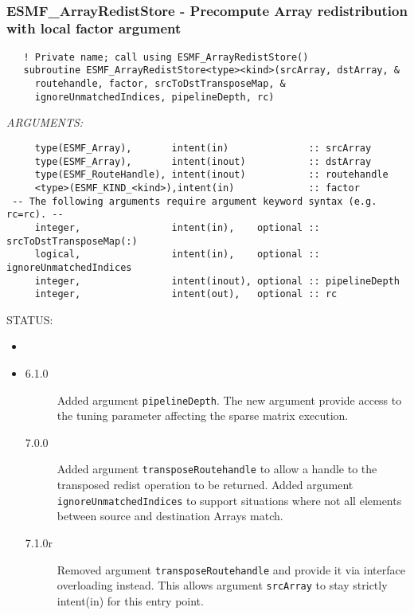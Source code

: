  
\mbox{}\hrulefill\ 
 
\subsubsection [ESMF\_ArrayRedistStore] {ESMF\_ArrayRedistStore - Precompute Array redistribution with local factor argument}


  
\begin{verbatim}   ! Private name; call using ESMF_ArrayRedistStore()
   subroutine ESMF_ArrayRedistStore<type><kind>(srcArray, dstArray, &
     routehandle, factor, srcToDstTransposeMap, &
     ignoreUnmatchedIndices, pipelineDepth, rc)\end{verbatim}{\em ARGUMENTS:}
\begin{verbatim}     type(ESMF_Array),       intent(in)              :: srcArray
     type(ESMF_Array),       intent(inout)           :: dstArray
     type(ESMF_RouteHandle), intent(inout)           :: routehandle
     <type>(ESMF_KIND_<kind>),intent(in)             :: factor
 -- The following arguments require argument keyword syntax (e.g. rc=rc). --
     integer,                intent(in),    optional :: srcToDstTransposeMap(:)
     logical,                intent(in),    optional :: ignoreUnmatchedIndices
     integer,                intent(inout), optional :: pipelineDepth
     integer,                intent(out),   optional :: rc\end{verbatim}
{\sf STATUS:}
   \begin{itemize}
   \item{}
   \item{}
   \begin{description}
   \item[6.1.0] Added argument {\tt pipelineDepth}.
                The new argument provide access to the tuning parameter
                affecting the sparse matrix execution.
   \item[7.0.0] Added argument {\tt transposeRoutehandle} to allow a handle to
                the transposed redist operation to be returned.\newline
                Added argument {\tt ignoreUnmatchedIndices} to support situations 
                where not all elements between source and destination Arrays 
                match.
   \item[7.1.0r] Removed argument {\tt transposeRoutehandle} and provide it
                via interface overloading instead. This allows argument 
                {\tt srcArray} to stay strictly intent(in) for this entry point.
   \end{description}
   \end{itemize}
  
